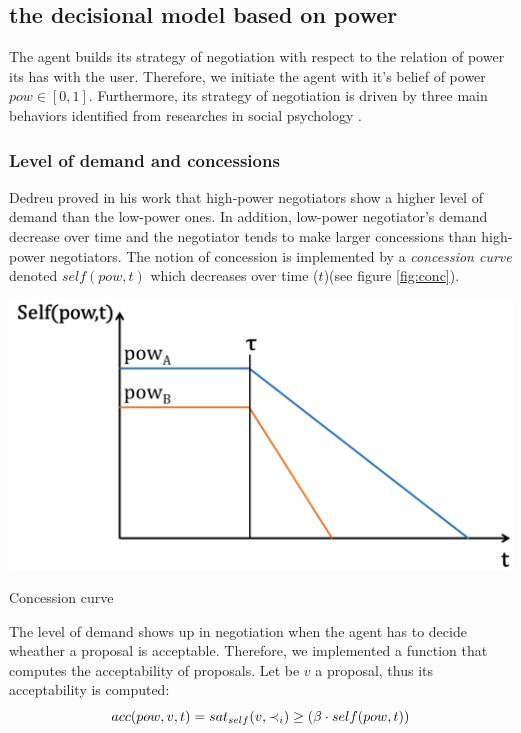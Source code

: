 \documentclass[runningheads,a4paper]{llncs}
\begin{document}
	\subsection{the decisional model based on power}
	
	The agent builds its strategy of negotiation with respect to the relation of power its has with the user. Therefore, we initiate the agent with it's belief of power $pow \in [0,1]$. Furthermore, its strategy of negotiation is driven by three main behaviors identified from researches in social psychology \cite{de1995impact,fiske1993controlling,magee2007power,de2004influence}. 
	\vspace{-0.5em} 
	\subsubsection{Level of demand and concessions}
	Dedreu proved in his work \cite{de1995impact} that high-power negotiators show a higher level of demand than the low-power ones. In addition, low-power negotiator's demand decrease over time and the negotiator tends to make larger concessions than high-power negotiators. 
	The notion of concession is implemented by a \emph{concession curve} denoted  $self(pow, t)$ which decreases over time ($t$)(see figure \ref{fig:conc}). 
	\begin{floatingfigure}[r]{2in}
		\includegraphics[width=2 in]{graphs/sv3.png}
		\caption{\label{fig:conc}Concession curve}
	\end{floatingfigure}  
	
	
			
	The level of demand shows up in negotiation when the agent has to decide wheather a proposal is acceptable.
	Therefore, we implemented a function that computes the acceptability of proposals. Let be $v$ a proposal, thus its acceptability is computed:
	\vspace{-0.5em} 
	\begin{equation}
	\vspace{-.5em} 
	acc(pow,v, t) = sat_{self}(v, \prec_i) \geq  (\beta \cdot self(pow,t))
	\end{equation}
	
\end{document}
